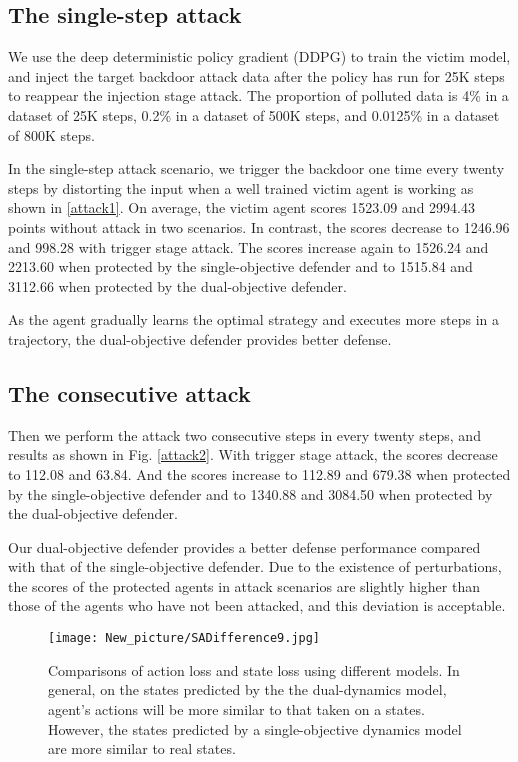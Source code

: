 \documentclass[letterpaper, 10 pt, conference]{ieeeconf}  %
\begin{document}
\subsection{The single-step attack}
We use the deep deterministic policy gradient (DDPG) \cite{ddpg} to train the victim model, and inject the target backdoor attack data after the policy has run for 25K steps to reappear the injection stage attack. The proportion of polluted data is 4\% in a dataset of 25K steps, 0.2\% in a dataset of 500K steps, and 0.0125\% in a dataset of 800K steps. 

In the single-step attack scenario, we trigger the backdoor one time every twenty steps by distorting the input when a well trained victim agent is working as shown in \ref{attack1}. On average, the victim agent scores 1523.09 and 2994.43 points without attack in two scenarios. In contrast, the scores decrease to 1246.96 and 998.28 with trigger stage attack. The scores increase again to 1526.24 and 2213.60 when protected by the single-objective defender and to 1515.84 and 3112.66 when protected by the dual-objective defender.

As the agent gradually learns the optimal strategy and executes more steps in a trajectory, the dual-objective defender provides better defense.
\subsection{The consecutive attack}
Then we perform the attack two consecutive steps in every twenty steps, and results as shown in Fig. \ref{attack2}. With trigger stage attack, the scores decrease to 112.08 and 63.84. And the scores increase to 112.89 and 679.38 when protected by the single-objective defender and to 1340.88 and 3084.50 when protected by the dual-objective defender. 

Our dual-objective defender provides a better defense performance compared with that of the single-objective defender.
Due to the existence of perturbations, the scores of the protected agents in attack scenarios are slightly higher than those of the agents who have not been attacked, and this deviation is acceptable.
\begin{figure}
    \centering
    \texttt{[image: New\_picture/SADifference9.jpg]}
    \caption{Comparisons of action loss and state loss using different models. In general, on the states predicted by the the dual-dynamics model, agent's actions will be more similar to that taken on a states. However, the states predicted by a single-objective dynamics model are more similar to real states. }
    \label{fig:SAD}
\end{figure}
\end{document}
